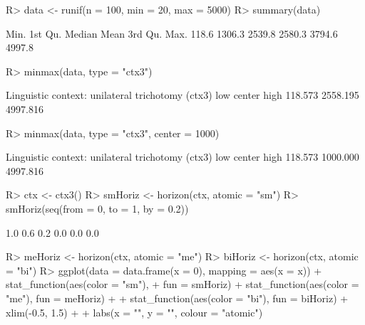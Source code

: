 \documentclass{article}\usepackage[]{graphicx}\usepackage[]{color}
\begin{document}
\begin{Schunk}
% --begin: "minmax"
\begin{Sinput}
R> data <- runif(n = 100, min = 20, max = 5000)
R> summary(data)
\end{Sinput}
\begin{Soutput}
   Min. 1st Qu.  Median    Mean 3rd Qu.    Max. 
  118.6  1306.3  2539.8  2580.3  3794.6  4997.8 
\end{Soutput}
\begin{Sinput}
R> minmax(data, type = "ctx3")
\end{Sinput}
\begin{Soutput}
Linguistic context: unilateral trichotomy (ctx3)
     low   center     high 
 118.573 2558.195 4997.816 
\end{Soutput}
%
% --end: "minmax"
\end{Schunk}

\begin{Schunk}
% --begin: "minmax2"
\begin{Sinput}
R> minmax(data, type = "ctx3", center = 1000)
\end{Sinput}
\begin{Soutput}
Linguistic context: unilateral trichotomy (ctx3)
     low   center     high 
 118.573 1000.000 4997.816 
\end{Soutput}
%
% --end: "minmax2"
\end{Schunk}

\begin{Schunk}
% --begin: "horizon"
\begin{Sinput}
R> ctx <- ctx3()
R> smHoriz <- horizon(ctx, atomic = "sm")
R> smHoriz(seq(from = 0, to = 1, by = 0.2))
\end{Sinput}
\begin{Soutput}
[1] 1.0 0.6 0.2 0.0 0.0 0.0
\end{Soutput}
%
% --end: "horizon"
\end{Schunk}

\begin{Schunk}
\begin{Sinput}
R> meHoriz <- horizon(ctx, atomic = "me")
R> biHoriz <- horizon(ctx, atomic = "bi")
R> ggplot(data = data.frame(x = 0), mapping = aes(x = x)) + stat_function(aes(color = "sm"), 
+      fun = smHoriz) + stat_function(aes(color = "me"), fun = meHoriz) + 
+      stat_function(aes(color = "bi"), fun = biHoriz) + xlim(-0.5, 1.5) + 
+      labs(x = "", y = "", colour = "atomic\nexpression")
\end{Sinput}
\end{Schunk}
\end{document}
